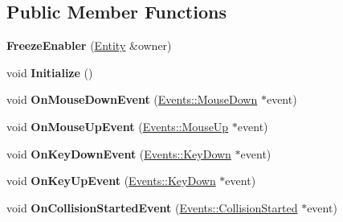 \subsection*{Public Member Functions}
\begin{DoxyCompactItemize}
\item 
\hypertarget{classDCEngine_1_1Components_1_1FreezeEnabler_a7260725ce293fc14948abe28c88efb7a}{{\bfseries Freeze\-Enabler} (\hyperlink{classDCEngine_1_1Entity}{Entity} \&owner)}\label{classDCEngine_1_1Components_1_1FreezeEnabler_a7260725ce293fc14948abe28c88efb7a}

\item 
\hypertarget{classDCEngine_1_1Components_1_1FreezeEnabler_a983bf70a4c528800d30fc8dab8c65138}{void {\bfseries Initialize} ()}\label{classDCEngine_1_1Components_1_1FreezeEnabler_a983bf70a4c528800d30fc8dab8c65138}

\item 
\hypertarget{classDCEngine_1_1Components_1_1FreezeEnabler_a8a2928969d17db102461f44c21ab4ff8}{void {\bfseries On\-Mouse\-Down\-Event} (\hyperlink{classDCEngine_1_1Events_1_1MouseDown}{Events\-::\-Mouse\-Down} $\ast$event)}\label{classDCEngine_1_1Components_1_1FreezeEnabler_a8a2928969d17db102461f44c21ab4ff8}

\item 
\hypertarget{classDCEngine_1_1Components_1_1FreezeEnabler_a947118c09bc62e065834dca7f996f023}{void {\bfseries On\-Mouse\-Up\-Event} (\hyperlink{classDCEngine_1_1Events_1_1MouseUp}{Events\-::\-Mouse\-Up} $\ast$event)}\label{classDCEngine_1_1Components_1_1FreezeEnabler_a947118c09bc62e065834dca7f996f023}

\item 
\hypertarget{classDCEngine_1_1Components_1_1FreezeEnabler_a36ff9f475c7df5f795f2230ccebc2d75}{void {\bfseries On\-Key\-Down\-Event} (\hyperlink{classDCEngine_1_1Events_1_1KeyDown}{Events\-::\-Key\-Down} $\ast$event)}\label{classDCEngine_1_1Components_1_1FreezeEnabler_a36ff9f475c7df5f795f2230ccebc2d75}

\item 
\hypertarget{classDCEngine_1_1Components_1_1FreezeEnabler_ac11f03b783271971dc0ae5f6017bebbb}{void {\bfseries On\-Key\-Up\-Event} (\hyperlink{classDCEngine_1_1Events_1_1KeyDown}{Events\-::\-Key\-Down} $\ast$event)}\label{classDCEngine_1_1Components_1_1FreezeEnabler_ac11f03b783271971dc0ae5f6017bebbb}

\item 
\hypertarget{classDCEngine_1_1Components_1_1FreezeEnabler_a71a818720f9a8daa066c34c0a2c7b6e2}{void {\bfseries On\-Collision\-Started\-Event} (\hyperlink{classDCEngine_1_1Events_1_1CollisionStarted}{Events\-::\-Collision\-Started} $\ast$event)}\label{classDCEngine_1_1Components_1_1FreezeEnabler_a71a818720f9a8daa066c34c0a2c7b6e2}


\end{DoxyCompactItemize}
